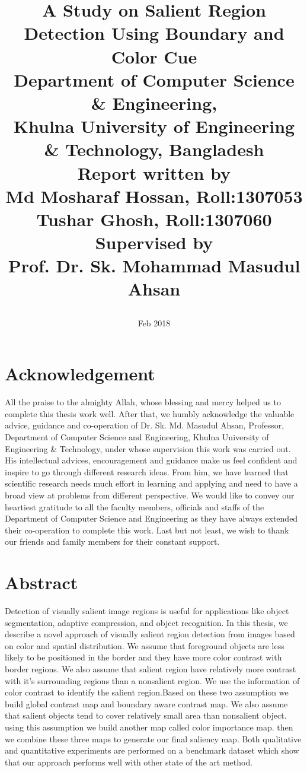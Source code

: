 \documentclass[12pt]{report}
\title{
    {\textbf{A Study on Salient Region Detection Using Boundary and Color Cue}}\\
	{\large Department of Computer Science & Engineering,}\\
	{\large Khulna University of Engineering & Technology, Bangladesh}\\
	{\small \textbf{Report written by}}\\
	{\small Md Mosharaf Hossan, Roll:1307053}\\
	{\small Tushar Ghosh, Roll:1307060}\\
	{\small \textbf{Supervised by}}\\
	{\small Prof. Dr. Sk. Mohammad Masudul Ahsan}\\
    {\date{Feb 2018}}
}
\begin{document}
\maketitle
%
%
%

\maketitle

\newpage
{}
\chapter*{Acknowledgement}

All the praise to the almighty Allah, whose blessing and mercy helped us to complete this thesis work well. After that, we humbly acknowledge the valuable advice, guidance and co-operation of Dr. Sk. Md. Masudul Ahsan, Professor, Department of Computer Science and Engineering, Khulna University of Engineering & Technology, under whose supervision this work was carried out. His intellectual advices, encouragement and guidance make us feel confident and inspire to go through different research ideas. From him, we have learned that scientific research needs much effort in learning and applying and need to have a broad view at problems from different perspective. We would like to convey our heartiest gratitude to all the faculty members, officials and staffs of the Department of Computer Science and Engineering as they have always extended their co-operation to complete this work. Last but not least, we wish to thank our friends and family members for their constant support.

\newpage
{}
\chapter*{Abstract}
Detection of visually salient image regions is useful for
applications like object segmentation, adaptive compression,
and object recognition. In this thesis, we describe a novel approach of visually salient region detection from images based on color and spatial distribution. We assume that foreground objects are less likely to be positioned in the border and they have more color contrast with border regions. We also assume that salient region have relatively more contrast with it's surrounding regions than a nonsalient region. We use the information of color contrast to identify the salient region.Based on these two assumption we build global contrast map and boundary aware contrast map. We also assume that salient objects tend to cover relatively small area than nonsalient object. using this assumption we build another map called color importance map. then we combine these three maps to generate our final saliency map. Both qualitative and quantitative experiments are performed on a benchmark dataset which show that our approach performs well with other state of the art method.
\end{document}
